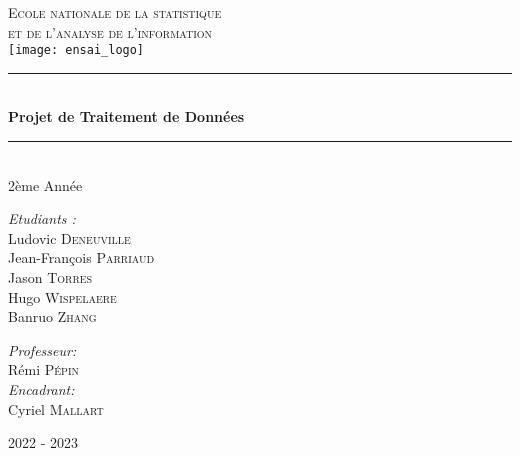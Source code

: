\documentclass[11pt]{article}
\newcommand{\HRule}{\rule{\linewidth}{0.5mm}}
\begin{document}

\begin{titlepage}
\begin{center}


\textsc{{\LARGE Ecole nationale de la statistique \\et de l'analyse de l'information}} \\ %
\vspace{5mm}
\texttt{[image: ensai\_logo]}\\[2 cm] %



\HRule \\[0.4cm]
{ \huge \bfseries Projet de Traitement de Données}\\[0.4cm]

\HRule \\[1cm]

{\Large 2ème Année}\\ [2cm]


\begin{flushleft} \Large
\emph{Etudiants :}\\
Ludovic \textsc{Deneuville} \\
Jean-François \textsc{Parriaud} \\
Jason \textsc{Torres} \\
Hugo \textsc{Wispelaere} \\
Banruo \textsc{Zhang} \\
\end{flushleft}

\begin{flushright} \Large
\emph{Professeur:} \\
Rémi \textsc{Pépin} \\
\emph{Encadrant:} \\
Cyriel \textsc{Mallart} \\
\end{flushright}


\vfill
{\large 2022 - 2023}
\end{center}
\end{titlepage} 


\end{document}
